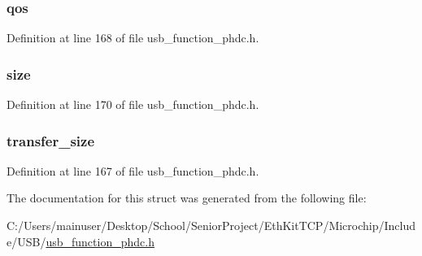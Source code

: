 \subsubsection[{qos}]{ qos}\label{struct_p_h_d_c___r_x___e_n_d_p_o_i_n_t___s_t_r_u_c_t_a992b69bcb851a8af26e51c2167b72fb5}


Definition at line 168 of file usb\+\_\+function\+\_\+phdc.\+h.

\hypertarget{struct_p_h_d_c___r_x___e_n_d_p_o_i_n_t___s_t_r_u_c_t_ac86594fb76193cdd5825e2a13c09f1bd}{}
\subsubsection[{size}]{ size}\label{struct_p_h_d_c___r_x___e_n_d_p_o_i_n_t___s_t_r_u_c_t_ac86594fb76193cdd5825e2a13c09f1bd}


Definition at line 170 of file usb\+\_\+function\+\_\+phdc.\+h.

\hypertarget{struct_p_h_d_c___r_x___e_n_d_p_o_i_n_t___s_t_r_u_c_t_a4bf75e6c826876c02decdae1f52a7a55}{}
\subsubsection[{transfer\+\_\+size}]{ transfer\+\_\+size}\label{struct_p_h_d_c___r_x___e_n_d_p_o_i_n_t___s_t_r_u_c_t_a4bf75e6c826876c02decdae1f52a7a55}


Definition at line 167 of file usb\+\_\+function\+\_\+phdc.\+h.



The documentation for this struct was generated from the following file\+:\begin{DoxyCompactItemize}
\item 
C\+:/\+Users/mainuser/\+Desktop/\+School/\+Senior\+Project/\+Eth\+Kit\+T\+C\+P/\+Microchip/\+Include/\+U\+S\+B/\hyperlink{usb__function__phdc_8h}{usb\+\_\+function\+\_\+phdc.\+h}\end{DoxyCompactItemize}
